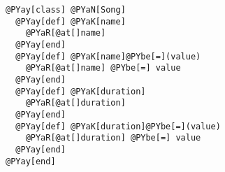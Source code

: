 \begin{Verbatim}[commandchars=@\[\]]
@PYay[class] @PYaN[Song]
  @PYay[def] @PYaK[name]
    @PYaR[@at[]name]
  @PYay[end]
  @PYay[def] @PYaK[name]@PYbe[=](value)
    @PYaR[@at[]name] @PYbe[=] value
  @PYay[end]
  @PYay[def] @PYaK[duration]
    @PYaR[@at[]duration]
  @PYay[end]
  @PYay[def] @PYaK[duration]@PYbe[=](value)
    @PYaR[@at[]duration] @PYbe[=] value
  @PYay[end]
@PYay[end]
\end{Verbatim}
